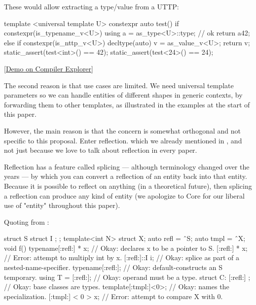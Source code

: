 \documentclass{wg21}
\begin{document}
These would allow extracting a type/value from a UTTP:

\begin{colorblock}
template <universal template U>
constexpr auto test() {
    if constexpr(is_typename_v<U>) {
        using a = as_type<U>::type; // ok
        return a{42};
    }
    else if constexpr(is_nttp_v<U>) {
        decltype(auto) v = as_value_v<U>;
        return v;
    }
}
static_assert(test<int>() == 42);
static_assert(test<24>() == 24);
\end{colorblock}

\href{https://godbolt.org/z/dv69odv4T}{[Demo on Compiler Explorer]}

The second reason is that use cases are limited.
We need universal template parameters so we can handle entities of different shapes in generic contexts, by forwarding them to other templates, as illustrated in the examples at the start of this paper.

However, the main reason is that the concern is somewhat orthogonal and not specific to this proposal.
Enter reflection. which we already mentioned in , and not just because we love to talk about reflection in every paper.

Reflection has a feature called splicing --- although terminology changed over the years --- by which you can convert a reflection of an entity
back into that entity. Because it is possible to reflect on anything (in a theoretical future), then splicing a reflection
can produce any kind of entity (we apologize to Core for our liberal use of "entity" throughout this paper).

Quoting from :

\begin{quoteblock}
\begin{colorblock}
struct S { struct I { }; };
template<int N> struct X;
auto refl = ˆS;
auto tmpl = ˆX;
void f() {
    typename[:refl:] * x; // Okay: declares x to be a pointer to S.
    [:refl:] * x; // Error: attempt to multiply int by x.
    [:refl:]::I i; // Okay: splice as part of a nested-name-specifier.
    typename[:refl:]{}; // Okay: default-constructs an S temporary.
    using T = [:refl:]; // Okay: operand must be a type.
    struct C: [:refl:] {}; // Okay: base classes are types.
    template[:tmpl:]<0>; // Okay: names the specialization.
    [:tmpl:] < 0 > x; // Error: attempt to compare X with 0.
}
\end{colorblock}
\end{quoteblock}
\end{document}
